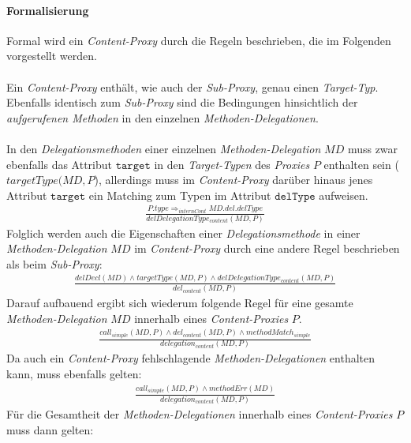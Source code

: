 \paragraph{Formalisierung}
Formal wird ein \emph{Content-Proxy} durch die Regeln beschrieben, die im Folgenden vorgestellt werden.\\\\
Ein \emph{Content-Proxy} enthält, wie auch der \emph{Sub-Proxy}, genau einen \emph{Target-Typ}. Ebenfalls identisch zum \emph{Sub-Proxy} sind die Bedingungen hinsichtlich der \emph{aufgerufenen Methoden} in den einzelnen \emph{Methoden-Delegationen}.
\\\\
In den \emph{Delegationsmethoden} einer einzelnen \emph{Methoden-Delegation} $\mathit{MD}$ muss zwar ebenfalls das Attribut $\texttt{target}$ in den \emph{Target-Typen}  des \emph{Proxies} $P$ enthalten sein ($\mathit{targetType(MD,P}$), allerdings muss im \emph{Content-Proxy} darüber hinaus jenes Attribut $\texttt{target}$ ein Matching zum Typen im Attribut $\texttt{delType}$ aufweisen. 
\begin{gather*}
\frac{\mathit{P.type} \Rightarrow_{internCont} \mathit{MD.del.delType}}
{\mathit{delDelegationType_{content}(MD,P)}}
\end{gather*}
\noindent
Folglich werden auch die Eigenschaften einer \emph{Delegationsmethode} in einer \emph{Methoden-Delegation} $\mathit{MD}$ im \emph{Content-Proxy} durch eine andere Regel beschrieben als beim \emph{Sub-Proxy}:
\begin{gather*}
\frac{\mathit{delDecl(MD)} \wedge \mathit{targetType(MD,P) \wedge \mathit{delDelegationType_{content}(MD,P)}}}
{\mathit{del_{content}(MD,P)}}
\end{gather*}
\noindent
Darauf aufbauend ergibt sich wiederum folgende Regel für eine gesamte \emph{Methoden-Delegation} $\mathit{MD}$ innerhalb eines \emph{Content-Proxies} $P$.
\begin{gather*}
\frac{\mathit{call_{simple}(MD, P)} \wedge \mathit{del_{content}(MD, P)} \wedge \mathit{methodMatch_{simple}}}
{\mathit{delegation_{content}(MD, P)}}
\end{gather*}
\noindent
Da auch ein \emph{Content-Proxy} fehlschlagende \emph{Methoden-Delegationen} enthalten kann, muss ebenfalls gelten:
\begin{gather*}
\frac{\mathit{call_{simple}(MD, P)} \wedge \mathit{methodErr(MD)}}
{\mathit{delegation_{content}(MD, P)}}
\end{gather*}
\noindent
Für die Gesamtheit der \emph{Methoden-Delegationen} innerhalb eines \emph{Content-Proxies} $P$ muss dann gelten:
